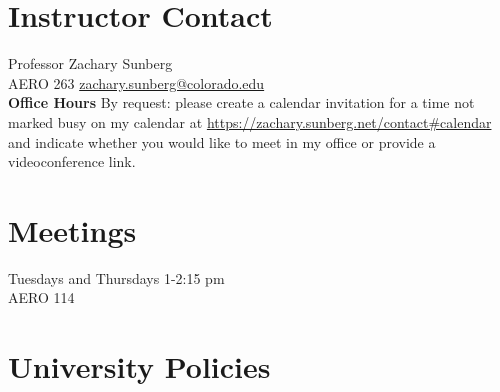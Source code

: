 \documentclass[9pt]{article}
\begin{document}
\section*{Instructor Contact}

Professor Zachary Sunberg\\
AERO 263 \href{mailto://zachary.sunberg@colorado.edu}{zachary.sunberg@colorado.edu}\\
\textbf{Office Hours}
By request: please create a calendar invitation for a time not marked busy on my calendar at \url{ https://zachary.sunberg.net/contact#calendar} and indicate whether you would like to meet in my office or provide a videoconference link. \\

\section*{Meetings}

Tuesdays and Thursdays 1-2:15 pm\\
AERO 114

\section*{University Policies}


\end{document}

